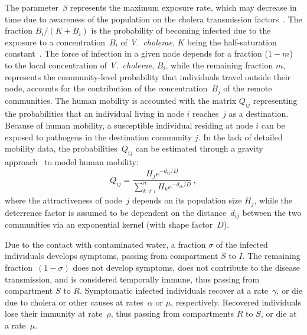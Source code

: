 The parameter~$\beta$ represents the maximum exposure rate, which may decrease in time due to awareness of the population on the cholera transmission factors~\cite{bertuzzo_probability_2016}. The fraction $B_{i}/(K+B_{i})$ is the probability of becoming infected due to the exposure to a concentration~$B_i$ of \textit{V.~cholerae}, $K$ being the half-saturation constant~\cite{codeco_endemic_2001}. The force of infection in a given node depends for a fraction ($1-m$) to the local concentration of \textit{V.~cholerae}, $B_i$, while the remaining fraction $m$, represents the community-level probability that individuals travel outside their node, accounts for the contribution of the concentration~$B_j$ of the remote communities. 
The human mobility is accounted with the matrix $Q_{ij}$ representing the probabilities that an individual living in node $i$ reaches~$j$ as a destination. Because of human mobility, a susceptible individual residing at node $i$ can be exposed to pathogens in the destination community $j$. 
In the lack of detailed mobility data,  the probabilities~$Q_{ij}$ can be estimated through a gravity approach~\cite{erlander_gravity_1990} to model human mobility:
%
\begin{equation}
Q_{ij} = \frac{H_j e^{-d_{ij}/D}}{\sum_{k \neq i}^n H_k e^{-d_{ik}/D}} \, ,
\label{eq:mob}
\end{equation}
%
where the attractiveness of node~$j$ depends on its population size $H_j$, while the deterrence factor is assumed to be dependent on the distance~$d_{ij}$ between the two communities via an exponential kernel (with shape factor~$D$).  

Due to the contact with contaminated water, a fraction $\sigma$ of the infected individuals develops symptoms, passing from compartment $S$ to $I$. The remaining fraction~$(1-\sigma)$ does not develop symptoms, does not contribute to the disease transmission, and is considered temporally immune, thus passing from compartment $S$ to $R$.  Symptomatic infected individuals recover at a rate~$\gamma$, or die due to cholera or other causes at rates~$\alpha$ or $\mu$, respectively.
Recovered individuals lose their immunity at rate~$\rho$, thus passing from compartments $R$ to $S$, or die at a rate~$\mu$.  %

